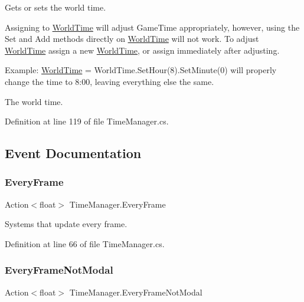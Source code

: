 Gets or sets the world time.

Assigning to \hyperlink{struct_world_time}{World\+Time} will adjust Game\+Time appropriately, however, using the Set and Add methods directly on \hyperlink{struct_world_time}{World\+Time} will not work. To adjust \hyperlink{struct_world_time}{World\+Time} assign a new \hyperlink{struct_world_time}{World\+Time}, or assign immediately after adjusting.

Example\+: {\ttfamily \hyperlink{struct_world_time}{World\+Time} = World\+Time.\+Set\+Hour(8).Set\+Minute(0)} will properly change the time to 8\+:00, leaving everything else the same.

The world time.

Definition at line 119 of file Time\+Manager.\+cs.



\subsection{Event Documentation}
\mbox{\label{class_time_manager_aab532df265c6f480671cdab70bed571b}} 
\subsubsection{\texorpdfstring{Every\+Frame}{EveryFrame}}
{\footnotesize\ttfamily Action$<$float$>$ Time\+Manager.\+Every\+Frame}



Systems that update every frame. 



Definition at line 66 of file Time\+Manager.\+cs.

\mbox{\label{class_time_manager_a084a70cfad60b39d423fe1113ae3f62f}} 
\subsubsection{\texorpdfstring{Every\+Frame\+Not\+Modal}{EveryFrameNotModal}}
{\footnotesize\ttfamily Action$<$float$>$ Time\+Manager.\+Every\+Frame\+Not\+Modal}



